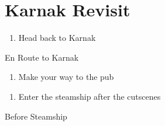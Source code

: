 \chapter{Karnak Revisit}

\vspace{\baselineskip}

\begin{paracol}{2}

\begin{enumerate}
    \item Head back to Karnak
\end{enumerate}

\switchcolumn
\begin{steproute}{En Route to Karnak}
\end{steproute}

\switchcolumn
\resume
\begin{enumerate}[resume]
    \item Make your way to the pub
\end{enumerate}

\switchcolumnTwice
\begin{enumerate}[resume]
    \item Enter the steamship after the cutscenes
\end{enumerate}

\switchcolumn
\begin{steproute}{Before Steamship}
\end{steproute}

\end{paracol}